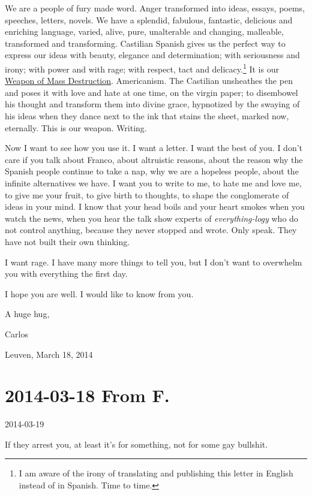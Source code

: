 \documentclass[]{book}
\let\rmarkdownfootnote\footnote%
\def\footnote{\protect\rmarkdownfootnote}
\begin{document}
We are a people of fury made word. Anger transformed into ideas, essays, poems, speeches, letters, novels. We have a splendid, fabulous, fantastic, delicious and enriching language, varied, alive, pure, unalterable and changing, malleable, transformed and transforming. Castilian Spanish gives us the perfect way to express our ideas with beauty, elegance and determination; with seriousness and irony; with power and with rage; with respect, tact and delicacy.\footnote{I am aware of the irony of translating and publishing this letter in English instead of in Spanish. Time to time.} It is our \href{https://en.wikipedia.org/wiki/Weapon_of_mass_destruction}{Weapon of Mass Destruction}. Americanism. The Castilian unsheathes the pen and poses it with love and hate at one time, on the virgin paper; to disembowel his thought and transform them into divine grace, hypnotized by the swaying of his ideas when they dance next to the ink that stains the sheet, marked now, eternally. This is our weapon. Writing.

Now I want to see how you use it. I want a letter. I want the best of you. I don't care if you talk about Franco, about altruistic reasons, about the reason why the Spanish people continue to take a nap, why we are a hopeless people, about the infinite alternatives we have. I want you to write to me, to hate me and love me, to give me your fruit, to give birth to thoughts, to shape the conglomerate of ideas in your mind. I know that your head boils and your heart smokes when you watch the news, when you hear the talk show experts of \emph{everything-logy} who do not control anything, because they never stopped and wrote. Only speak. They have not built their own thinking.

I want rage. I have many more things to tell you, but I don't want to overwhelm you with everything the first day.

I hope you are well. I would like to know from you.

A huge hug,

Carlos

Leuven, March 18, 2014

\hypertarget{toF20140319}{%
\section*{2014-03-18 From F.}\label{toF20140319}}

2014-03-19

If they arrest you, at least it's for something, not for some gay bullshit.
\end{document}
